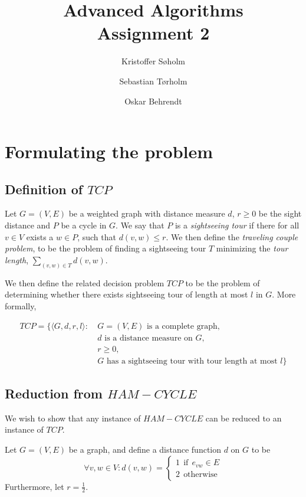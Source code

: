 \documentclass[11pt,a4paper]{article}
\title{Advanced Algorithms\\Assignment 2}
\author{Kristoffer Søholm \and Sebastian Tørholm \and Oskar Behrendt}
\begin{document}
\maketitle

\section{Formulating the problem}
\subsection{Definition of $TCP$}
Let $G = (V, E)$ be a weighted graph with distance measure $d$,
$r \geq 0$ be the sight distance and $P$ be a cycle in $G$. We say
that $P$ is a \emph{sightseeing tour} if there for all $v \in V$ exists a
$w \in P$, such that $d(v, w) \leq r$. We then define the \emph{traveling
couple problem}, to be the problem of finding a sightseeing tour $T$ minimizing
the \emph{tour length}, $\sum_{(v,w) \in T} d(v, w)$.

We then define the related decision problem $TCP$ to be the problem of determining
whether there exists sightseeing tour of length at most $l$ in $G$. More formally,

\begin{align*}
    TCP = \{ \langle G, d, r, l \rangle :\ & G = (V,E) \text{ is a complete graph}, \\
                                           & d \text{ is a distance measure on } G, \\
                                           & r \geq 0, \\
                                           & G \text{ has a sightseeing tour with tour length at most } l \}
\end{align*}

\subsection{Reduction from $HAM-CYCLE$}
We wish to show that any instance of $HAM-CYCLE$ can be reduced to an instance of $TCP$.

Let $G = (V, E)$ be a graph, and define a distance function $d$ on $G$ to be
\[
    \forall v, w \in V : d(v, w) = \begin{cases} 1\ \ \text{if}\ \ e_{vw} \in E \\
                                                 2\ \ \text{otherwise}
                                   \end{cases} 
\]
Furthermore, let $r = \frac{1}{2}$.
\end{document}
